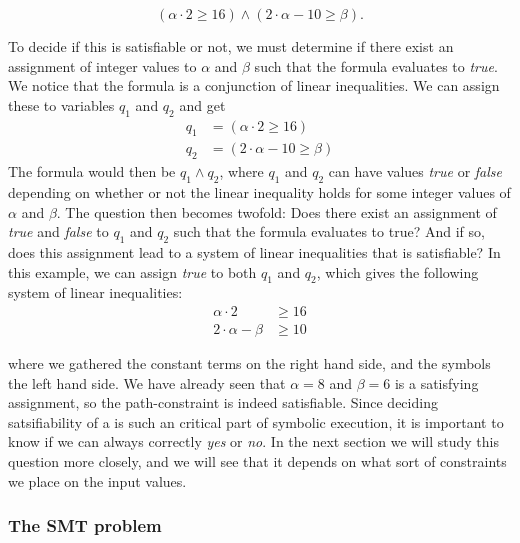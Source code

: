 	\begin{equation*}	
		(\alpha \cdot 2 \geq 16) \land (2\cdot \alpha - 10 \geq \beta).
	\end{equation*}
	
	To decide if this is satisfiable or not, we must determine if there exist an assignment of integer values to $\alpha$ and $\beta$ such that the formula evaluates to \emph{true}. We notice that the formula is a conjunction of linear inequalities. We can assign these to variables $q_1$ and $q_2$ and get
	\begin{align*}
		q_1 & = (\alpha \cdot 2 \geq 16) \\
		q_2 & = (2\cdot \alpha - 10 \geq \beta)
	\end{align*}
	The formula would then be $q_1 \land q_2$,
	where $q_1$ and $q_2$ can have values \emph{true} or \emph{false} depending on whether or not the linear inequality holds for some integer values of $\alpha$ and $\beta$. The question then becomes twofold: Does there exist an assignment of \emph{true} and \emph{false} to $q_1$ and $q_2$ such that the formula evaluates to true? And if so, does this assignment lead to a system of linear inequalities that is satisfiable?
	In this example, we can assign \emph{true} to both $q_1$ and $q_2$, which gives the following system of linear inequalities:
	\begin{align*}
		 \alpha \cdot 2 &\geq 16 \\
		2  \cdot  \alpha - \beta &\geq 10 
	\end{align*}
	
	where we gathered the constant terms on the right hand side, and the symbols the left hand side. We have already seen that $\alpha = 8$ and $\beta = 6$ is a satisfying assignment, so the path-constraint is indeed satisfiable. Since deciding satsifiability of a \pc is such an critical part of symbolic execution, it is important to know if we can always correctly \emph{yes} or \emph{no}. In the next section we will study this question more closely, and we will see that it depends on what sort of constraints we place on the input values. 
	\subsubsection{The SMT problem}


